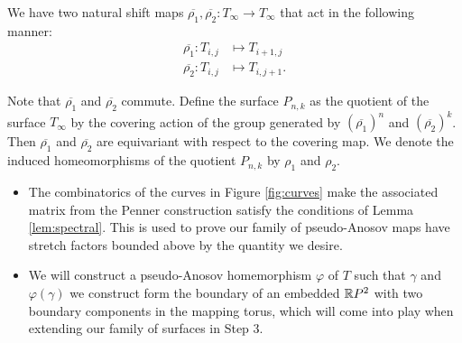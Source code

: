 We have two
natural shift maps $\overline{\rho_1},\overline{\rho_2}: T_\infty \to T_\infty$ that act in the
following manner:
\begin{align*}
  \overline{\rho_1}: T_{i,j} &\mapsto T_{i+1, j} \\
  \overline{\rho_2}: T_{i,j} &\mapsto T_{i, j+1}.
\end{align*}

Note that $\overline{\rho_1}$ and $\overline{\rho_2}$ commute. Define the surface $P_{n,k}$ as the quotient of the surface $T_\infty$ by the
covering action of the group generated by $(\overline{\rho_1})^n$ and $(\overline{\rho_2})^k$. Then
$\overline{\rho_1}$ and $\overline{\rho_2}$ are equivariant with respect to the covering map.  We denote the induced homeomorphisms of the quotient $P_{n,k}$ by $\rho_1$
and $\rho_2$.

\begin{itemize}
\item The combinatorics of the curves in Figure \ref{fig:curves} make the associated matrix from the Penner construction satisfy
  the conditions of Lemma \ref{lem:spectral}. This is used to prove our family of pseudo-Anosov maps have
  stretch factors bounded above by the quantity we desire.
\item We will construct a pseudo-Anosov homemorphism $\varphi$ of $T$ such that $\gamma$ and $\varphi(\gamma)$ we construct form the boundary of an embedded
  $\mathbb{R} P^2$ with two boundary components in the mapping torus, which will come into play when extending our family of surfaces in Step 3.
\end{itemize}

